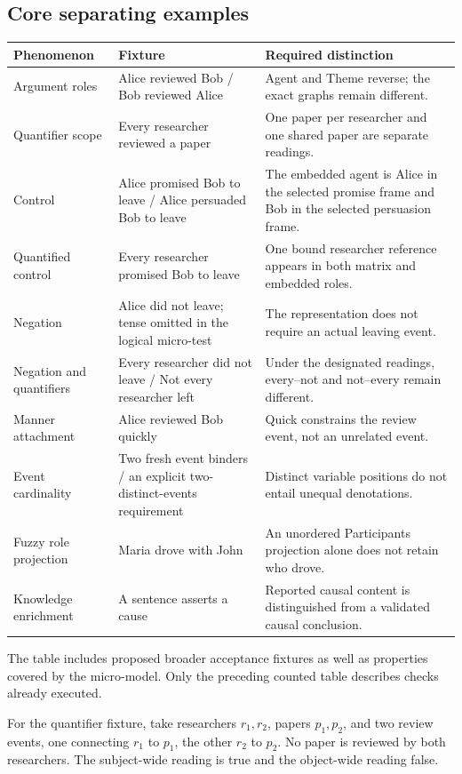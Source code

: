 \documentclass[11pt,a4paper]{article}
\begin{document}
\subsection{Core separating examples}
\begin{longtable}{L{37mm}L{54mm}L{57mm}}
\toprule
Phenomenon & Fixture & Required distinction \\
\midrule
\endhead
Argument roles &
Alice reviewed Bob / Bob reviewed Alice &
Agent and Theme reverse; the exact graphs remain different. \\
Quantifier scope &
Every researcher reviewed a paper &
One paper per researcher and one shared paper are separate readings. \\
Control &
Alice promised Bob to leave / Alice persuaded Bob to leave &
The embedded agent is Alice in the selected promise frame and Bob in the
selected persuasion frame. \\
Quantified control &
Every researcher promised Bob to leave &
One bound researcher reference appears in both matrix and embedded roles. \\
Negation &
Alice did not leave; tense omitted in the logical micro-test &
The representation does not require an actual leaving event. \\
Negation and quantifiers &
Every researcher did not leave / Not every researcher left &
Under the designated readings, every--not and not--every remain different. \\
Manner attachment &
Alice reviewed Bob quickly &
Quick constrains the review event, not an unrelated event. \\
Event cardinality &
Two fresh event binders / an explicit two-distinct-events requirement &
Distinct variable positions do not entail unequal denotations. \\
Fuzzy role projection &
Maria drove with John &
An unordered Participants projection alone does not retain who drove. \\
Knowledge enrichment &
A sentence asserts a cause &
Reported causal content is distinguished from a validated causal conclusion. \\
\bottomrule
\end{longtable}
The table includes proposed broader acceptance fixtures as well as properties
covered by the micro-model. Only the preceding counted table describes checks
already executed.

For the quantifier fixture, take researchers \(r_1,r_2\), papers \(p_1,p_2\),
and two review events, one connecting \(r_1\) to \(p_1\), the other \(r_2\)
to \(p_2\). No paper is reviewed by both researchers. The subject-wide reading
is true and the object-wide reading false.
\end{document}

